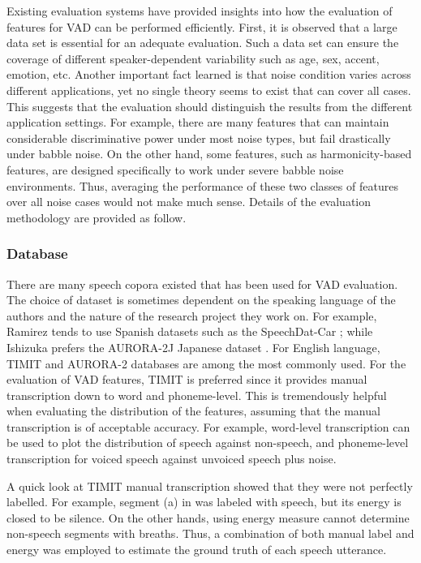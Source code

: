 Existing evaluation systems \cite{} have provided insights into how the evaluation of features for VAD can be performed efficiently. First, it is observed that a large data set is essential for an adequate evaluation. Such a data set can ensure the coverage of different speaker-dependent variability such as age, sex, accent, emotion, etc. Another important fact learned is that noise condition varies across different applications, yet no single theory seems to exist that can cover all cases. This suggests that the evaluation should distinguish the results from the different application settings. For example, there are many features that can maintain considerable discriminative power under most noise types, but fail drastically under babble noise. On the other hand, some features, such as harmonicity-based features, are designed specifically to work under severe babble noise environments. Thus, averaging the performance of these two classes of features over all noise cases would not make much sense.
Details of the evaluation methodology are provided as follow.

\subsubsection{Database}
There are many speech copora existed that has been used for VAD evaluation. The choice of dataset is sometimes dependent on the speaking language of the authors and the nature of the research project they work on. For example, Ramirez \etal tends to use Spanish datasets such as the SpeechDat-Car \cite{moreno2000speechdat}; while Ishizuka \etal prefers the AURORA-2J Japanese dataset \cite{nakamura2005aurora}. For English language, TIMIT \cite{garofolo1993darpa} and AURORA-2 \cite{pearce2000aurora} databases are among the most commonly used. For the evaluation of VAD features, TIMIT is preferred since it provides manual transcription down to word and phoneme-level. This is tremendously helpful when evaluating the distribution of the features, assuming that the manual transcription is of acceptable accuracy. For example, word-level transcription can be used to plot the distribution of speech against non-speech, and phoneme-level transcription for voiced speech against unvoiced speech plus noise.

A quick look at TIMIT manual transcription showed that they were not perfectly labelled. For example, segment (a) in  was labeled with speech, but its energy is closed to be silence. On the other hands, using energy measure cannot determine non-speech segments with breaths. Thus, a combination of both manual label and energy was employed to estimate the ground truth of each speech utterance.

